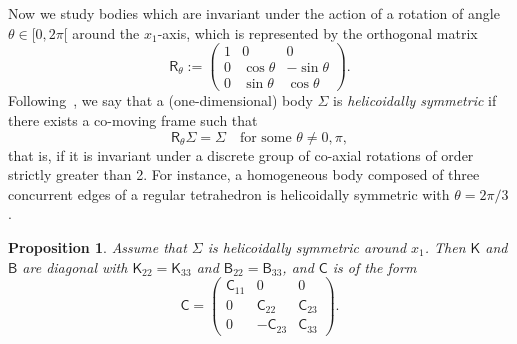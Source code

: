 \documentclass[final]{amsart}
\newtheorem{prop}[thm]{Proposition}
\theoremstyle{definition}
\theoremstyle{definition}
\theoremstyle{remark}
\begin{document}
Now we study bodies which are invariant under the action of a rotation
of angle $\theta\in[0,2\pi[$ around the $x_1$-axis, which is represented
by the orthogonal matrix
\[
{\mathsf R}_\theta:=\begin{pmatrix}
1 & 0 & 0\\
0 & \cos\theta & -\sin\theta\\
0 & \sin\theta & \cos\theta
\end{pmatrix}.
\]
Following~\cite{HapBre65}, we say that a (one-dimensional) body ${\Sigma}$
is {\em helicoidally symmetric} if there exists a co-moving frame such that
\[
{\mathsf R}_\theta {\Sigma} = {\Sigma}\quad\text{for some $\theta\neq 0,\pi$},
\]
that is, if it is invariant under a discrete group of co-axial rotations of
order strictly greater than 2. For instance, a homogeneous body
composed of three concurrent edges of a regular tetrahedron is
helicoidally symmetric with $\theta=2\pi/3$.
\begin{prop}\label{prop:heli}
  Assume that ${\Sigma}$ is helicoidally symmetric around $x_1$. Then ${\mathsf K}$ and ${\mathsf B}$ are diagonal with ${\mathsf K}_{22}= {\mathsf K}_{33}$ and
  ${\mathsf B}_{22}= {\mathsf B}_{33}$, and ${\mathsf C}$ is of the form
\[
{\mathsf C}=
\begin{pmatrix}
{\mathsf C}_{11} & 0 & 0\\
0 & {\mathsf C}_{22} & {\mathsf C}_{23}\\
0 & -{\mathsf C}_{23} & {\mathsf C}_{33}
\end{pmatrix}.
\]
\end{prop}
\end{document}
